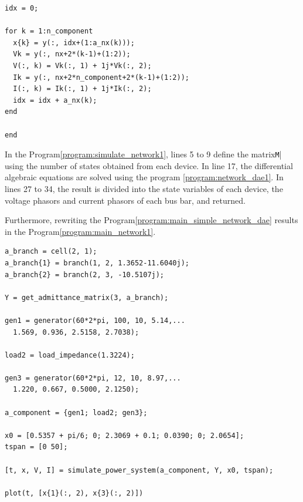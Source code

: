 \documentclass[graybox, envcountchap]{svmult}
\begin{document}
\begin{example}
\begin{PROGRAMA}[count,title={simulate\_power\_system.m}]
\begin{verbatim}
idx = 0;

for k = 1:n_component
  x{k} = y(:, idx+(1:a_nx(k)));
  Vk = y(:, nx+2*(k-1)+(1:2));
  V(:, k) = Vk(:, 1) + 1j*Vk(:, 2);
  Ik = y(:, nx+2*n_component+2*(k-1)+(1:2));
  I(:, k) = Ik(:, 1) + 1j*Ik(:, 2);
  idx = idx + a_nx(k);
end

end
\end{verbatim}
\end{PROGRAMA}

In the Program\nobreak\ref{program:simulate_network1}, lines 5 to 9 define the matrix\verb|M|| using the number of states obtained from each device.
In line 17, the differential algebraic equations are solved using the program \nobreak\ref{program:network_dae1}.
In lines 27 to 34, the result is divided into the state variables of each device, the voltage phasors and current phasors of each bus bar, and returned.

Furthermore, rewriting the Program\nobreak\ref{program:main_simple_network_dae} results in the Program\nobreak\ref{program:main_network1}.

\smallskip
\begin{PROGRAMA}[count,title={main\_simulation\_3bus.m}]\label{program:main_network1}
\begin{verbatim}
a_branch = cell(2, 1);
a_branch{1} = branch(1, 2, 1.3652-11.6040j);
a_branch{2} = branch(2, 3, -10.5107j);

Y = get_admittance_matrix(3, a_branch);

gen1 = generator(60*2*pi, 100, 10, 5.14,...
  1.569, 0.936, 2.5158, 2.7038);

load2 = load_impedance(1.3224);

gen3 = generator(60*2*pi, 12, 10, 8.97,...
  1.220, 0.667, 0.5000, 2.1250);

a_component = {gen1; load2; gen3};

x0 = [0.5357 + pi/6; 0; 2.3069 + 0.1; 0.0390; 0; 2.0654];
tspan = [0 50];

[t, x, V, I] = simulate_power_system(a_component, Y, x0, tspan);

plot(t, [x{1}(:, 2), x{3}(:, 2)])
\end{verbatim}
\end{PROGRAMA}


\end{example}
\end{document}
